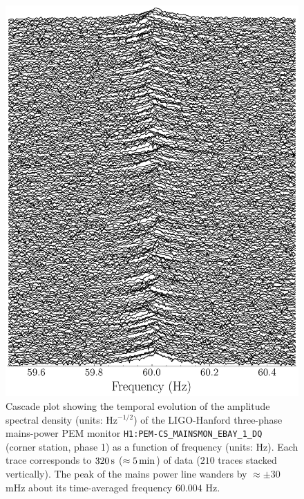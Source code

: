 \documentclass[pra,superscriptaddress,reprint,amsmath,amssymb,nofootinbib]{revtex4-2}
\newcommand{\CSOneName}{\texttt{H1:PEM-CS\_MAINSMON\_EBAY\_1\_DQ}}
\begin{document}
\begin{figure}
	\includegraphics[width=\columnwidth]{images/new_cascade_O3_new}
	\caption{Cascade plot showing the temporal evolution of the amplitude spectral density (units: Hz$^{-1/2}$) of the LIGO-Hanford three-phase mains-power PEM monitor \CSOneName~ (corner station, phase 1) as a function of frequency (units: Hz). Each trace corresponds to $320\,{\rm s}$ ($\approx 5\,{\rm min}$) of data ($210$ traces stacked vertically). The peak of the mains power line wanders by $\approx \pm 30$ mHz about its time-averaged frequency $60.004$ Hz.}
	\label{fig:powerCascade}
\end{figure}





\end{document}
